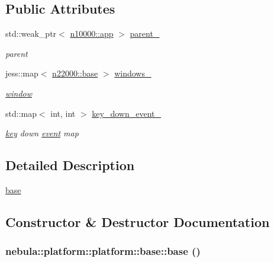 \subsection*{Public Attributes}
\begin{DoxyCompactItemize}
\item 
std::weak\_\-ptr$<$ \hyperlink{classnebula_1_1framework_1_1app}{n10000::app} $>$ \hyperlink{classnebula_1_1platform_1_1platform_1_1base_a20c93586aaa0da756703ee2ac5ca9c7d}{parent\_\-}
\begin{DoxyCompactList}\small\item\em parent \item\end{DoxyCompactList}\item 
jess::map$<$ \hyperlink{classnebula_1_1platform_1_1window_1_1base}{n22000::base} $>$ \hyperlink{classnebula_1_1platform_1_1platform_1_1base_a9ac945d6a76a355ed39be20e5d802011}{windows\_\-}
\begin{DoxyCompactList}\small\item\em \hyperlink{namespacenebula_1_1platform_1_1window}{window} \item\end{DoxyCompactList}\item 
std::map$<$ int, int $>$ \hyperlink{classnebula_1_1platform_1_1platform_1_1base_a26b2e3a38e35687673293a0c72cf821f}{key\_\-down\_\-event\_\-}
\begin{DoxyCompactList}\small\item\em \hyperlink{classnebula_1_1platform_1_1key}{key} down \hyperlink{structnebula_1_1platform_1_1platform_1_1base_1_1event}{event} map \item\end{DoxyCompactList}\end{DoxyCompactItemize}


\subsection{Detailed Description}
\hyperlink{classnebula_1_1platform_1_1platform_1_1base}{base} 

\subsection{Constructor \& Destructor Documentation}
\hypertarget{classnebula_1_1platform_1_1platform_1_1base_ab5473b3326da0afc860eec802b01fcf8}{
\subsubsection[{base}]{\setlength{\rightskip}{0pt plus 5cm}nebula::platform::platform::base::base ()}}
\label{classnebula_1_1platform_1_1platform_1_1base_ab5473b3326da0afc860eec802b01fcf8}


